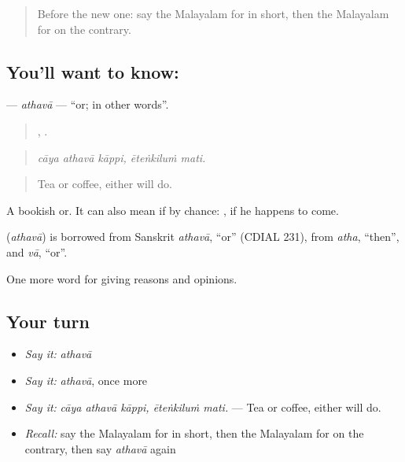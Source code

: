 \label{lesson:ML-C412-athava}



\begin{quote}
Before the new one: say the Malayalam for in short, then the Malayalam for on the contrary.
\end{quote}

\subsection*{You'll want to know: }
\textbf{} — \emph{athavā} — \textquotedblleft{}or; in other words\textquotedblright{}.

\begin{quote}
  ,  .
\end{quote}

\begin{quote}
\emph{cāya athavā kāppi, ēteṅkiluṁ mati.}
\end{quote}

\begin{quote}
Tea or coffee, either will do.
\end{quote}

A bookish or. It can also mean if by chance:   , if he happens to come.

\begin{cousinweb}
\textbf{} (\emph{athavā}) is borrowed from Sanskrit \emph{athavā}, \textquotedblleft{}or\textquotedblright{} (CDIAL 231), from \emph{atha}, \textquotedblleft{}then\textquotedblright{}, and \emph{vā}, \textquotedblleft{}or\textquotedblright{}.
\end{cousinweb}

\begin{grammarlens}[title={What you've built}]
One more word for giving reasons and opinions.
\end{grammarlens}

\subsection*{Your turn}
\begin{itemize}
\raggedright
  \item \emph{Say it:} \emph{athavā}
  \item \emph{Say it:} \emph{athavā}, once more
  \item \emph{Say it:} \emph{cāya athavā kāppi, ēteṅkiluṁ mati.} — Tea or coffee, either will do.
  \item \emph{Recall:} say the Malayalam for in short, then the Malayalam for on the contrary, then say \emph{athavā} again
\end{itemize}

